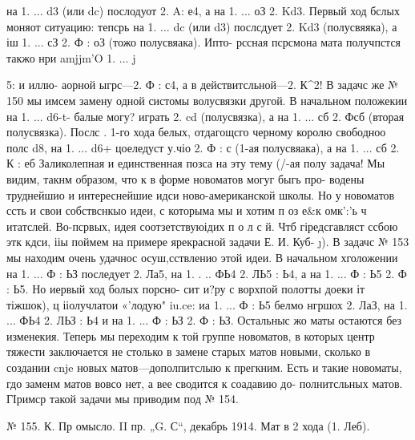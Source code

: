 {на 1. ... d3 (или dc) послодуот 2. A: е4, а на 1. ... оЗ 2. Kd3. Первый ход бслых моняот ситуацию: тепсрь на 1. ... dc (или d3) послсдует
2. Kd3 (полусвяяка), а іш 1. ... сЗ 2. Ф : оЗ (тожо полусвяака). Ипто- рссная псрсмона мата получпстся такжо нри amjjm'O 1. ... j{5: и иллю- аорной ыгрс—2. Ф : с4, а в действитсльной—2. К^2!
    В задачс же № 150 мы имсем замену одной систомы волусвязки другой. В начальном положекии на 1. ... d6-t- балые могу? играть
2. cd (полусвязка), а на 1. ... сб 2. Фсб (вторая полусвязка). Послс . 1-го хода белых, отдагощсго черному королю свободноо полс d8, на 1. ... d6+ цоеледуст у.чіо 2. Ф : с\6 (1-ая полусвяака), а на 1. ... сб 2. К : еб Заликолепная и единственная позса на эту тему
(/-ая полу задача!
     Мы видим, такнм образом, что к в форме новоматов могуг быгь про- водены труднейшио и интереснейшие идси ново-американской школы. Но у новоматов ссть и свои собствснкыо идеи, с которыма мы и хотим п оз е&к омк':'ь ч итатслей.
     Во-псрвых, идея соотзетствуюідих п о л с й. Чтб гіредсгавляст ссбою этк кдси, ііы поймем на примере ярекрасной задачи Е. И. Куб- \j{}).
    В задачс № 153 мы находим очень удачнос осуш,сствленио этой идеи. В начальном хголожении на 1. ... Ф : ЬЗ последует 2. Ла5, на 1. . .. ФЬ4
2. ЛЬ5 : Ь4, а на 1. ... Ф : Ь5 2. Ф : Ь5. Но иервый ход болых порсно- сит и?ру с ворхпой полотты доеки іт тіжшок), ц ііолучлатои «'лодую" iu.ce: иа 1. ... Ф : Ь5 белмо нгршох 2. ЛаЗ, на 1. ... ФЬ4 2. ЛЬЗ : Ь4 и на 1. ... Ф : ЬЗ 2. Ф : ЬЗ. Остальныс жо маты остаются без изменекия.
    Теперь мы переходим к той группе новоматов, в которых центр тяжести заключается не столько в замене старых матов новыми, сколько в создании cnje новых матов—дополпитслыю к прегкним. Есть и такие новоматы, гдо заменм матов вовсо нет, а вее сводится к соадавию до- полнитсльных матов. ГІримср такой задачи мы приводим под № 154.

№ 155. К. Пр омысло.
II пр. „G. С“, декабрь 1914.
Мат в 2 хода (1. Леб).
	

}}
